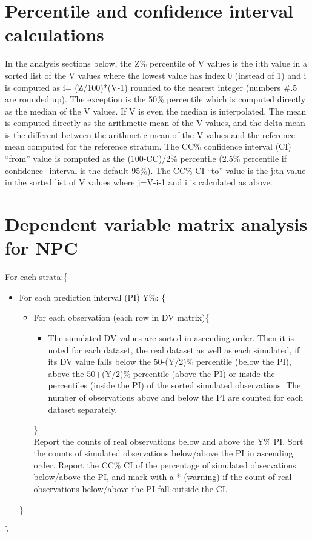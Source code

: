 \section{Percentile and confidence interval calculations}
In the analysis sections below, the Z\% percentile of V values is the i:th value in a sorted list of the V values where the lowest value has index 0 (instead of 1) and i is computed as i= (Z/100)*(V-1) rounded to the nearest integer (numbers \#.5 are rounded up). The exception is the 50\% percentile which is computed directly as the median of the V values. If V is even the median is interpolated. The mean is computed directly as the arithmetic mean of the V values, and the delta-mean is the different between the arithmetic mean of the V values and the reference mean computed for the reference stratum.  The CC\% confidence interval (CI) “from” value is computed as the (100-CC)/2\% percentile (2.5\% percentile if confidence\_interval is the default 95\%). The CC\% CI “to” value is the j:th value in the sorted list of V values where j=V-i-1 and i is calculated as above.
\newpage
\section{Dependent variable matrix analysis for NPC}
For each strata:\{
\begin{itemize}
\item[] For each prediction interval (PI) Y\%: \{
\begin{itemize}
\item[] For each observation (each row in DV matrix)\{
\begin{itemize}
\item[] The simulated DV values are sorted in ascending order. Then it is noted for each dataset, the real dataset as well as each simulated, if its DV value falls below the 50-(Y/2)\% percentile (below the PI), above the 50+(Y/2)\% percentile (above the PI) or inside the percentiles (inside the PI) of the sorted simulated observations. The number of observations above and below the PI are counted for each dataset separately.
\end{itemize}
\}\\
Report the counts of real observations below and above the Y\% PI. Sort the counts of simulated observations below/above the PI in ascending order. Report the CC\% CI of the percentage of simulated observations below/above the PI, and mark with a * (warning) if the count of real observations below/above the PI fall outside the CI.
\end{itemize}
\}
\end{itemize}
\}
